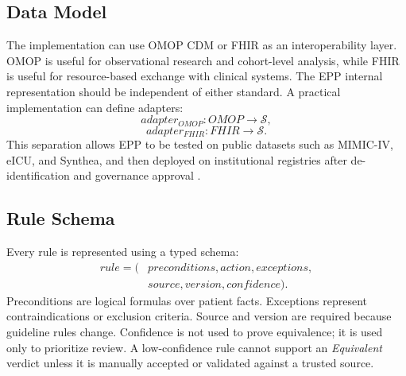 \documentclass[english,5p,twocolumn,preprint]{elsarticle}
\newcommand{\State}{\mathcal{S}}
\begin{document}
\subsection{Data Model}
The implementation can use OMOP CDM or FHIR as an interoperability layer. OMOP is useful for observational research and cohort-level analysis, while FHIR is useful for resource-based exchange with clinical systems. The EPP internal representation should be independent of either standard. A practical implementation can define adapters:
\begin{equation}
    adapter_{OMOP}: OMOP \rightarrow \State,
\end{equation}
\begin{equation}
    adapter_{FHIR}: FHIR \rightarrow \State.
\end{equation}
This separation allows EPP to be tested on public datasets such as MIMIC-IV, eICU, and Synthea, and then deployed on institutional registries after de-identification and governance approval \cite{johnson2023mimiciv,pollard2018eicu,walonoski2018synthea}.

\subsection{Rule Schema}
Every rule is represented using a typed schema:
\begin{equation}
\begin{split}
    rule = (&preconditions, action, exceptions,\\
            &source, version, confidence).
\end{split}
\end{equation}
Preconditions are logical formulas over patient facts. Exceptions represent contraindications or exclusion criteria. Source and version are required because guideline rules change. Confidence is not used to prove equivalence; it is used only to prioritize review. A low-confidence rule cannot support an \emph{Equivalent} verdict unless it is manually accepted or validated against a trusted source.
\end{document}
